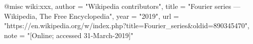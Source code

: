 
@misc{ wiki:xxx,
    author = "{Wikipedia contributors}",
    title = "Fourier series --- {Wikipedia}{,} The Free Encyclopedia",
    year = "2019",
    url = "https://en.wikipedia.org/w/index.php?title=Fourier_series&oldid=890345470",
    note = "[Online; accessed 31-March-2019]"
  }